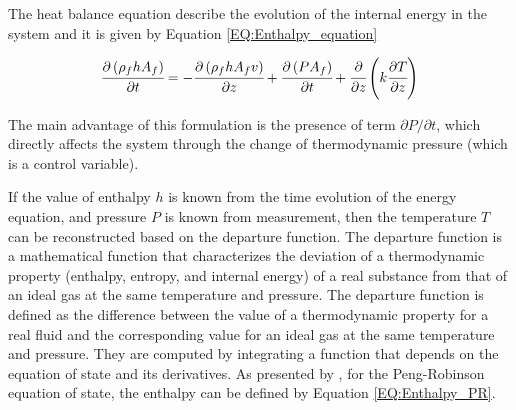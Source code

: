 \documentclass[../Article_Model_Parameters.tex]{subfiles}
\begin{document}

			The heat balance equation describe the evolution of the internal energy in the system and it is given by Equation \ref{EQ:Enthalpy_equation}
			
			{\footnotesize
				\begin{equation} \label{EQ:Enthalpy_equation}
					\cfrac{\partial \left(\rho_f {\color{black}h} A_f\right)}{\partial t} = - \cfrac{\partial \left( \rho_f {\color{black}h} A_f v \right)}{\partial z} + \cfrac{\partial \left(P A_f\right)}{\partial t} + \cfrac{\partial}{\partial z} \left( k \cfrac{\partial T}{\partial z} \right)
				\end{equation}
			}
			
			The main advantage of this formulation is the presence of term $\partial P / \partial t $, which directly affects the system through the change of thermodynamic pressure (which is a control variable). %
			
			If the value of enthalpy $h$ is known from the time evolution of the energy equation, and pressure $P$ is known from measurement, then the temperature $T$ can be reconstructed based on the departure function. The departure function is a mathematical function that characterizes the deviation of a thermodynamic property (enthalpy, entropy, and internal energy) of a real substance from that of an ideal gas at the same temperature and pressure. The departure function is defined as the difference between the value of a thermodynamic property for a real fluid and the corresponding value for an ideal gas at the same temperature and pressure. They are computed by integrating a function that depends on the equation of state and its derivatives. As presented by \citet{Gmehling2019}, for the Peng-Robinson equation of state, the enthalpy can be defined by Equation \ref{EQ:Enthalpy_PR}.
			
\end{document}
